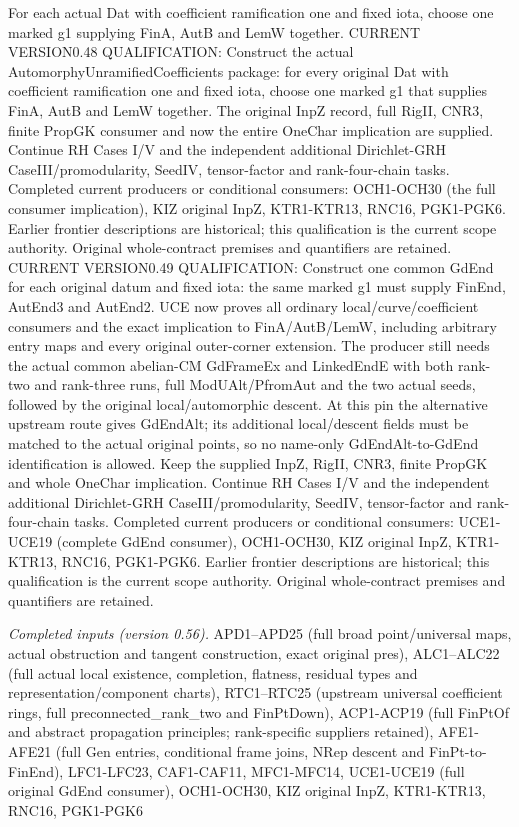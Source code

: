 For each actual Dat with coefficient ramification one and fixed iota, choose one marked g1 supplying FinA, AutB and LemW together. CURRENT VERSION0.48 QUALIFICATION: Construct the actual AutomorphyUnramifiedCoefficients package: for every original Dat with coefficient ramification one and fixed iota, choose one marked g1 that supplies FinA, AutB and LemW together. The original InpZ record, full RigII, CNR3, finite PropGK consumer and now the entire OneChar implication are supplied. Continue RH Cases I/V and the independent additional Dirichlet-GRH CaseIII/promodularity, SeedIV, tensor-factor and rank-four-chain tasks. Completed current producers or conditional consumers: OCH1-OCH30 (the full consumer implication), KIZ original InpZ, KTR1-KTR13, RNC16, PGK1-PGK6. Earlier frontier descriptions are historical; this qualification is the current scope authority. Original whole-contract premises and quantifiers are retained. CURRENT VERSION0.49 QUALIFICATION: Construct one common GdEnd for each original datum and fixed iota: the same marked g1 must supply FinEnd, AutEnd3 and AutEnd2. UCE now proves all ordinary local/curve/coefficient consumers and the exact implication to FinA/AutB/LemW, including arbitrary entry maps and every original outer-corner extension. The producer still needs the actual common abelian-CM GdFrameEx and LinkedEndE with both rank-two and rank-three runs, full ModUAlt/PfromAut and the two actual seeds, followed by the original local/automorphic descent. At this pin the alternative upstream route gives GdEndAlt; its additional local/descent fields must be matched to the actual original points, so no name-only GdEndAlt-to-GdEnd identification is allowed. Keep the supplied InpZ, RigII, CNR3, finite PropGK and whole OneChar implication. Continue RH Cases I/V and the independent additional Dirichlet-GRH CaseIII/promodularity, SeedIV, tensor-factor and rank-four-chain tasks. Completed current producers or conditional consumers: UCE1-UCE19 (complete GdEnd consumer), OCH1-OCH30, KIZ original InpZ, KTR1-KTR13, RNC16, PGK1-PGK6. Earlier frontier descriptions are historical; this qualification is the current scope authority. Original whole-contract premises and quantifiers are retained.

\emph{Completed inputs (version 0.56).} APD1–APD25 (full broad point/universal maps, actual obstruction and tangent construction, exact original pres), ALC1–ALC22 (full actual local existence, completion, flatness, residual types and representation/component charts), RTC1–RTC25 (upstream universal coefficient rings, full preconnected\_\allowbreak rank\_\allowbreak two and FinPtDown), ACP1-ACP19 (full FinPtOf and abstract propagation principles; rank-specific suppliers retained), AFE1-AFE21 (full Gen entries, conditional frame joins, NRep descent and FinPt-to-FinEnd), LFC1-LFC23, CAF1-CAF11, MFC1-MFC14, UCE1-UCE19 (full original GdEnd consumer), OCH1-OCH30, KIZ original InpZ, KTR1-KTR13, RNC16, PGK1-PGK6


